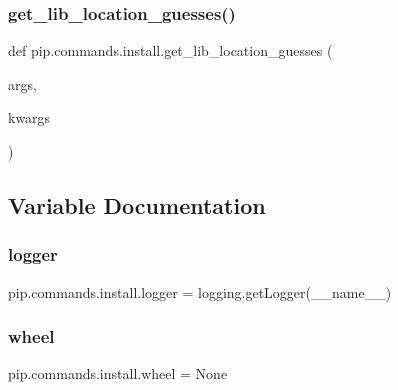 \subsubsection{\texorpdfstring{get\+\_\+lib\+\_\+location\+\_\+guesses()}{get\_lib\_location\_guesses()}}
{\footnotesize\ttfamily def pip.\+commands.\+install.\+get\+\_\+lib\+\_\+location\+\_\+guesses (\begin{DoxyParamCaption}\item[{}]{args,  }\item[{}]{kwargs }\end{DoxyParamCaption})}



\subsection{Variable Documentation}
\mbox{\label{namespacepip_1_1commands_1_1install_acfcff048c8cc28d587aa495beda3638b}} 
\subsubsection{\texorpdfstring{logger}{logger}}
{\footnotesize\ttfamily pip.\+commands.\+install.\+logger = logging.\+get\+Logger(\+\_\+\+\_\+name\+\_\+\+\_\+)}

\mbox{\label{namespacepip_1_1commands_1_1install_a3444b754519ea80c66f8942952656251}} 
\subsubsection{\texorpdfstring{wheel}{wheel}}
{\footnotesize\ttfamily pip.\+commands.\+install.\+wheel = None}

